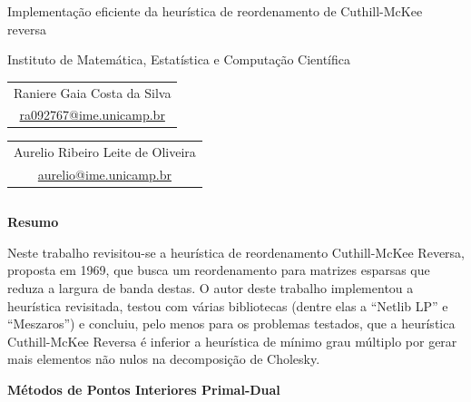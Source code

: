 \documentclass[]{beamer}
\begin{document}
\begin{frame}[t,fragile]
  \begin{center}
    \begin{huge}
      Implementa\c{c}\~{a}o eficiente da heur\'{i}stica de reordenamento de Cuthill-McKee reversa

      \vspace{20pt}
      Instituto de Matemática, Estatística e Computação Científica
    \end{huge}

    \vspace{20pt}
    \begin{Large}
      \begin{tabular}[]{c}
        Raniere Gaia Costa da Silva \\
        \url{ra092767@ime.unicamp.br}
      \end{tabular} \hspace{5cm}
      \begin{tabular}[]{c}
        Aurelio Ribeiro Leite de Oliveira \\
        \url{aurelio@ime.unicamp.br}
      \end{tabular}
    \end{Large}
  \end{center}
  \vspace{20pt}

  \begin{columns}[t]
    \begin{column}{0.4\textwidth}
      \textbf{Resumo}

      Neste trabalho revisitou-se a heurística de reordenamento Cuthill-McKee Reversa,
      proposta em 1969, que busca um reordenamento para matrizes esparsas que reduza a
      largura de banda destas. O autor deste trabalho implementou a heurística
      revisitada, testou com várias bibliotecas (dentre elas a ``Netlib LP'' e
      ``Meszaros'') e concluiu, pelo menos para os problemas testados, que a
      heurística Cuthill-McKee Reversa é inferior a heurística de mínimo grau
      múltiplo por gerar mais elementos não nulos na decomposição de Cholesky.

      \textbf{Métodos de Pontos Interiores Primal-Dual}


\end{column}
\end{columns}
\end{frame}
\end{document}
